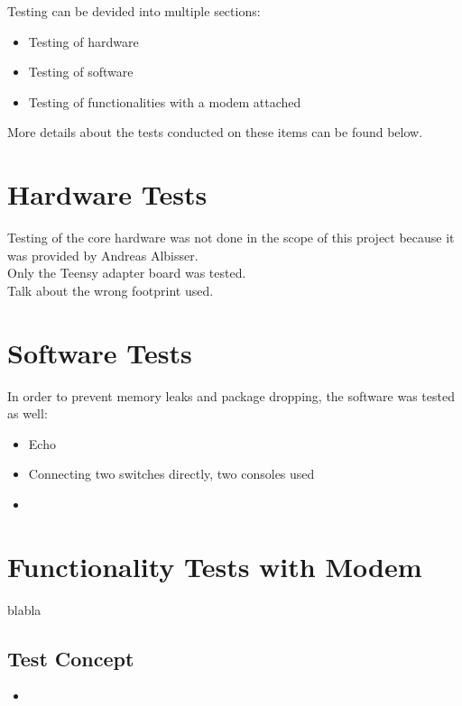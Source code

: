 %
Testing can be devided into multiple sections:
\begin{itemize}
    \item Testing of hardware
    \item Testing of software 
    \item Testing of functionalities with a modem attached
\end{itemize}
More details about the tests conducted on these items can be found below.
%
%
%
%
\section{Hardware Tests}
Testing of the core hardware was not done in the scope of this project because it was provided by Andreas Albisser.\\
Only the Teensy adapter board was tested. \\
Talk about the wrong footprint used.\\
%
%
%
%
%
\section{Software Tests}
In order to prevent memory leaks and package dropping, the software was tested as well:\\
\begin{itemize}
    \item Echo
    \item Connecting two switches directly, two consoles used
    \item 
\end{itemize}
%
%
%
%
%
\section{Functionality Tests with Modem}
blabla
\subsection{Test Concept}
\begin{itemize}
    \item 
\end{itemize}
